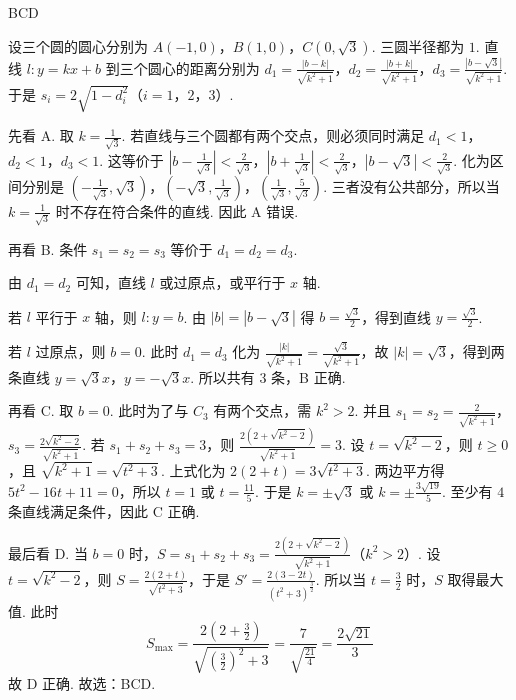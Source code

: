 \begin{answer}
BCD
\end{answer}

\begin{solution}
设三个圆的圆心分别为 \(A(-1,0)\)，\(B(1,0)\)，\(C(0,\sqrt{3})\). 三圆半径都为 \(1\). 直线 \(l:y=kx+b\) 到三个圆心的距离分别为 \(d_1=\frac{\left| b-k \right|}{\sqrt{k^2+1}}\)，\(d_2=\frac{\left| b+k \right|}{\sqrt{k^2+1}}\)，\(d_3=\frac{\left| b-\sqrt{3} \right|}{\sqrt{k^2+1}}\). 于是 \(s_i=2\sqrt{1-d_i^2}\)（\(i=1\)，\(2\)，\(3\)）.

先看 A. 取 \(k=\frac{1}{\sqrt{3}}\). 若直线与三个圆都有两个交点，则必须同时满足 \(d_1<1\)，\(d_2<1\)，\(d_3<1\). 这等价于 \(\left| b-\frac{1}{\sqrt{3}} \right|<\frac{2}{\sqrt{3}}\)，\(\left| b+\frac{1}{\sqrt{3}} \right|<\frac{2}{\sqrt{3}}\)，\(\left| b-\sqrt{3} \right|<\frac{2}{\sqrt{3}}\). 化为区间分别是 \(\left( -\frac{1}{\sqrt{3}},\sqrt{3} \right)\)，\(\left( -\sqrt{3},\frac{1}{\sqrt{3}} \right)\)，\(\left( \frac{1}{\sqrt{3}},\frac{5}{\sqrt{3}} \right)\).
三者没有公共部分，所以当 \(k=\frac{1}{\sqrt{3}}\) 时不存在符合条件的直线. 因此 A 错误.

再看 B. 条件 \(s_1=s_2=s_3\) 等价于 \(d_1=d_2=d_3\).

由 \(d_1=d_2\) 可知，直线 \(l\) 或过原点，或平行于 \(x\) 轴.

若 \(l\) 平行于 \(x\) 轴，则 \(l:y=b\). 由 \(\left| b \right|=\left| b-\sqrt{3} \right|\) 得 \(b=\frac{\sqrt{3}}{2}\)，得到直线 \(y=\frac{\sqrt{3}}{2}\).

若 \(l\) 过原点，则 \(b=0\). 此时 \(d_1=d_3\) 化为 \(\frac{\left| k \right|}{\sqrt{k^2+1}}=\frac{\sqrt{3}}{\sqrt{k^2+1}}\)，故 \(\left| k \right|=\sqrt{3}\)，得到两条直线 \(y=\sqrt{3}x\)，\(y=-\sqrt{3}x\).
所以共有 \(3\) 条，B 正确.

再看 C. 取 \(b=0\). 此时为了与 \(C_3\) 有两个交点，需 \(k^2>2\). 并且 \(s_1=s_2=\frac{2}{\sqrt{k^2+1}}\)，\(s_3=\frac{2\sqrt{k^2-2}}{\sqrt{k^2+1}}\). 若 \(s_1+s_2+s_3=3\)，则 \(\frac{2\left( 2+\sqrt{k^2-2} \right)}{\sqrt{k^2+1}}=3\). 设 \(t=\sqrt{k^2-2}\)，则 \(t\ge 0\)，且 \(\sqrt{k^2+1}=\sqrt{t^2+3}\). 上式化为 \(2\left( 2+t \right)=3\sqrt{t^2+3}\).
两边平方得 \(5t^2-16t+11=0\)，所以 \(t=1\) 或 \(t=\frac{11}{5}\). 于是 \(k=\pm \sqrt{3}\) 或 \(k=\pm \frac{3\sqrt{19}}{5}\).
至少有 \(4\) 条直线满足条件，因此 C 正确.

最后看 D. 当 \(b=0\) 时，\(S=s_1+s_2+s_3=\frac{2\left( 2+\sqrt{k^2-2} \right)}{\sqrt{k^2+1}}\)（\(k^2>2\)）. 设 \(t=\sqrt{k^2-2}\)，则 \(S=\frac{2\left( 2+t \right)}{\sqrt{t^2+3}}\)，于是 \(S'=\frac{2\left( 3-2t \right)}{\left( t^2+3 \right)^{\frac{3}{2}}}\).
所以当 \(t=\frac{3}{2}\) 时，\(S\) 取得最大值. 此时
\[
S_{\max}=\frac{2\left( 2+\frac{3}{2} \right)}{\sqrt{\left( \frac{3}{2} \right)^2+3}}=\frac{7}{\sqrt{\frac{21}{4}}}=\frac{2\sqrt{21}}{3}
\]
故 D 正确.
故选：BCD.
\end{solution}

